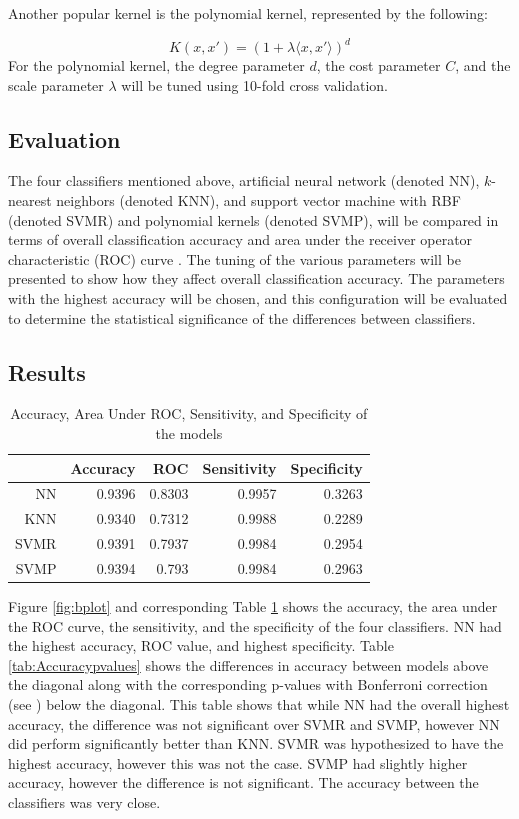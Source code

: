\documentclass[twoside,11pt]{article}
\begin{document}
Another popular kernel is the polynomial kernel, represented by the following:

\begin{equation}
  K(x, x') = (1 + \lambda \langle x, x' \rangle)^d
\end{equation}
For the polynomial kernel, the degree parameter $d$, the cost parameter $C$, and
the scale parameter $\lambda$ will be tuned using 10-fold cross validation.

\subsection{Evaluation}

The four classifiers mentioned above, artificial neural network (denoted NN),
$k$-nearest neighbors (denoted KNN), and support vector machine with RBF
(denoted SVMR) and polynomial kernels (denoted SVMP), will be compared in terms
of overall classification accuracy and area under the receiver operator
characteristic (ROC) curve \cite{Zweig:1993}.  The tuning of the various
parameters will be presented to show how they affect overall classification
accuracy.  The parameters with the highest accuracy will be chosen, and this
configuration will be evaluated to determine the statistical significance of
the differences between classifiers.

\subsection{Results}
\begin{table}[htbp]
  \centering
  \caption{Accuracy, Area Under ROC, Sensitivity, and Specificity of the models}
    \begin{tabular}{rrrrr}
      \hline
    & Accuracy & ROC   & Sensitivity  & Specificity \\
\hline    
    NN    & 0.9396 & 0.8303 & 0.9957 & 0.3263 \\
    KNN   & 0.9340 & 0.7312 & 0.9988 & 0.2289 \\
    SVMR  & 0.9391 & 0.7937 & 0.9984 & 0.2954 \\
    SVMP  & 0.9394 & 0.793 & 0.9984 & 0.2963 \\
    \hline
    \end{tabular}%
  \label{tab:roc}%
\end{table}
Figure \ref{fig:bplot} and corresponding Table \ref{tab:roc} shows the
accuracy, the area under the ROC curve, the sensitivity, and the specificity of
the four classifiers.  NN had the highest accuracy, ROC value, and highest
specificity.  Table \ref{tab:Accuracypvalues} shows the differences in accuracy
between models above the diagonal along with the corresponding p-values with
Bonferroni correction (see ) below the diagonal.  This
table shows that while NN had the overall highest accuracy, the difference was
not significant over SVMR and SVMP, however NN did perform significantly better
than KNN.  SVMR was hypothesized to have the highest accuracy, however this was
not the case.  SVMP had slightly higher accuracy, however the difference is not
significant.  The accuracy between the classifiers was very close.
\end{document}
